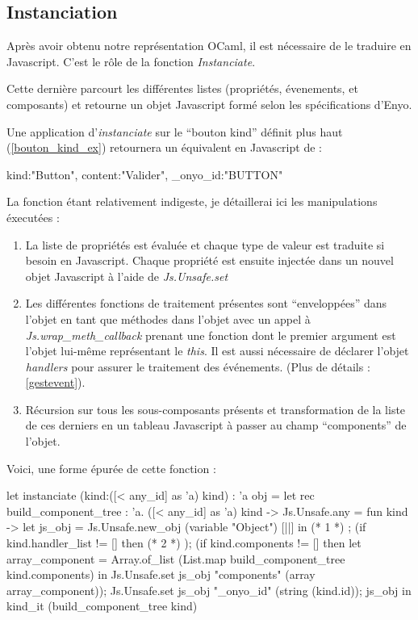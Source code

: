 \documentclass[11pt,a4paper]{report}
\begin{document}
\subsection{Instanciation}

Après avoir obtenu notre représentation OCaml, il est nécessaire de le traduire en Javascript.
C'est le rôle de la fonction \emph{Instanciate}.

Cette dernière parcourt les différentes listes (propriétés, évenements, et composants) et retourne
un objet Javascript formé selon les spécifications d'Enyo.

Une application d'\emph{instanciate} sur le ``bouton kind'' définit plus haut (\ref{bouton_kind_ex}) 
retournera un équivalent en Javascript de :

\begin{JavaScript}
  {kind:"Button", content:"Valider", _onyo_id:"BUTTON"}
\end{JavaScript}

La fonction étant relativement indigeste, je détaillerai ici les manipulations éxecutées :

\begin{enumerate}
\item La liste de propriétés est évaluée et chaque type de valeur est traduite si besoin en Javascript.
  Chaque propriété est ensuite injectée dans un nouvel objet Javascript à l'aide de \emph{Js.Unsafe.set}
\item \label{wrap_meth} 
  Les différentes fonctions de traitement présentes sont ``enveloppées'' dans l'objet en tant que méthodes
  dans l'objet avec un appel à \\\emph{Js.wrap\_meth\_callback} prenant une fonction dont le premier argument
  est l'objet lui-même représentant le \emph{this}. Il est aussi nécessaire de déclarer l'objet
  \emph{handlers} pour assurer le traitement des événements.
  (Plus de détails : \ref{gestevent}).
\item Récursion sur tous les sous-composants présents et transformation de la liste de ces derniers en 
  un tableau Javascript à passer au champ ``components'' de l'objet.
\end{enumerate}

Voici, une forme épurée de cette fonction :

\begin{OCaml}
    let instanciate (kind:([< any_id] as 'a) kind) : 'a obj =
      let rec build_component_tree : 'a. ([< any_id] as 'a) kind -> Js.Unsafe.any = fun kind ->
          let js_obj = Js.Unsafe.new_obj (variable "Object") [||]
          in
          (* 1 *)
          ;
          (if kind.handler_list != [] then
              (* 2 *)
          );
          (if kind.components != []  then
              let array_component = Array.of_list (List.map build_component_tree kind.components) in
	      Js.Unsafe.set js_obj "components" (array array_component));
          Js.Unsafe.set js_obj "_onyo_id" (string (kind.id));
          js_obj in
       kind_it (build_component_tree kind)
\end{OCaml}
\end{document}
